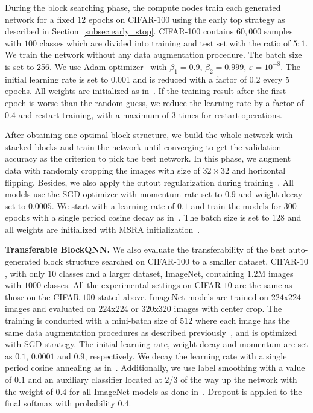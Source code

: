 \documentclass[10pt,journal,compsoc]{IEEEtran}
\begin{document}
During the block searching phase, the compute nodes train each generated network for a fixed $12$ epochs on CIFAR-$100$ using the early top strategy as described in Section~\ref{subsec:early_stop}. CIFAR-100 contains $60,000$ samples with $100$ classes which are divided into training and test set with the ratio of $5:1$. We train the network without any data augmentation procedure. 
The batch size is set to 256. We use Adam optimizer~\cite{kingma2014adam} with \(\beta_1 = 0.9  \), \(\beta_2 = 0.999  \), \(\varepsilon =10^{-8} \). The initial learning rate is set to 0.001 and is reduced with a factor of $0.2$ every $5$ epochs. All weights are initialized as in~\cite{he2015delving}. 
If the training result after the first epoch is worse than the random guess, we reduce the learning rate by a factor of $0.4$ and restart training, with a maximum of $3$ times for restart-operations. 

After obtaining one optimal block structure, we build the whole network with stacked blocks and train the network until converging to get the validation accuracy as the criterion to pick the best network. In this phase, we augment data with randomly cropping the images with size of $32\times 32$ and horizontal flipping. Besides, we also apply the cutout regularization during training~\cite{devries2017cutout}. All models use the SGD optimizer with momentum rate set to $0.9$ and weight decay set to $0.0005$. We start with a learning rate of $0.1$ and train the models for $300$ epochs with a single period cosine decay as in~\cite{loshchilov2016sgdr}. The batch size is set to $128$ and all weights are initialized with MSRA initialization~\cite{he2015delving}.


\vspace{0.1cm}\noindent \textbf{Transferable BlockQNN.} 
We also evaluate the transferability of the best auto-generated block structure searched on CIFAR-$100$ to a smaller dataset, CIFAR-$10$, with only $10$ classes and a larger dataset, ImageNet, containing $1.2$M images with $1000$ classes. All the experimental settings on CIFAR-$10$ are the same as those on the CIFAR-$100$ stated above.
ImageNet models are trained on $224$x$224$ images and evaluated on $224$x$224$ or $320$x$320$ images with center crop. The training is conducted with a mini-batch size of $512$ where each image has the same data augmentation procedures as described previously~\cite{szegedy2015rethinking}, and is optimized with SGD strategy. The initial learning rate, weight decay and momentum are set as $0.1$, $0.0001$ and $0.9$, respectively. We decay the learning rate with a single period cosine annealing as in~\cite{loshchilov2016sgdr}.
Additionally, we use label smoothing with a value of $0.1$ and an auxiliary classifier located at $2/3$ of the way up the network with the weight of $0.4$ for all ImageNet models as done in~\cite{szegedy2015rethinking}. Dropout is applied to the final softmax with probability $0.4$.
\end{document}
